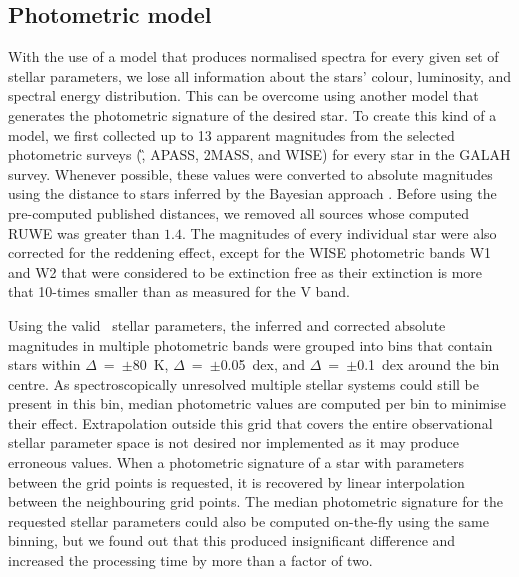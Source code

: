\subsection{Photometric model}
\label{sec:p_model}
With the use of a model that produces normalised spectra for every given set of stellar parameters, we lose all information about the stars' colour, luminosity, and spectral energy distribution. This can be overcome using another model that generates the photometric signature of the desired star. To create this kind of a model, we first collected up to 13 apparent magnitudes from the selected photometric surveys (\G, APASS, 2MASS, and WISE) for every star in the GALAH survey. Whenever possible, these values were converted to absolute magnitudes using the distance to stars inferred by the Bayesian approach \cite{2018AJ....156...58B}. Before using the pre-computed published distances, we removed all sources whose computed RUWE was greater than $1.4$. The magnitudes of every individual star were also corrected for the reddening effect, except for the WISE photometric bands W1 and W2 that were considered to be extinction free as their extinction is more that 10-times smaller than as measured for the V band.

Using the valid \TC\ stellar parameters, the inferred and corrected absolute magnitudes in multiple photometric bands were grouped into bins that contain stars within $\Delta$\Teff~=~$\pm$80~K, $\Delta$\Logg~=~$\pm$0.05~dex, and $\Delta$\Feh~=~$\pm$0.1~dex around the bin centre. As spectroscopically unresolved multiple stellar systems could still be present in this bin, median photometric values are computed per bin to minimise their effect. Extrapolation outside this grid that covers the entire observational stellar parameter space is not desired nor implemented as it may produce erroneous values. When a photometric signature of a star with parameters between the grid points is requested, it is recovered by linear interpolation between the neighbouring grid points. The median photometric signature for the requested stellar parameters could also be computed on-the-fly using the same binning, but we found out that this produced insignificant difference and increased the processing time by more than a factor of two.

